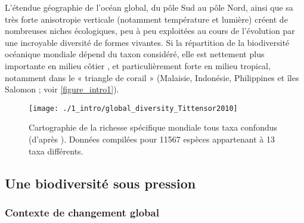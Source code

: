 L’étendue géographie de l’océan global, du pôle Sud au pôle Nord, ainsi que sa très forte anisotropie verticale (notamment température et lumière) créent de nombreuses niches écologiques, peu à peu exploitées au cours de l’évolution par une incroyable diversité de formes vivantes. Si la répartition de la biodiversité océanique mondiale dépend du taxon considéré, elle est nettement plus importante en milieu côtier \citep{tittensor_global_2010}, et particulièrement forte en milieu tropical, notamment dans le « triangle de corail » \citep{sanciangco_habitat_2013} (Malaisie, Indonésie, Philippines et îles Salomon ; voir \autoref{figure_intro1}).


\begin{figure}[H]
	\begin{center}
	\texttt{[image: ./1\_intro/global\_diversity\_Tittensor2010]}
		\caption[Cartographie de la richesse spécifique mondiale tous taxa confondus]{Cartographie de la richesse spécifique mondiale tous taxa confondus (d'après \citet{tittensor_global_2010}). Données compilées pour 11567 espèces appartenant à 13 taxa différents.}
	\label{figure_intro1}
\end{center}
\end{figure}

\subsection{Une biodiversité sous pression}\label{intro.1.2}

\subsubsection{Contexte de changement global}\label{intro.1.2.1}

